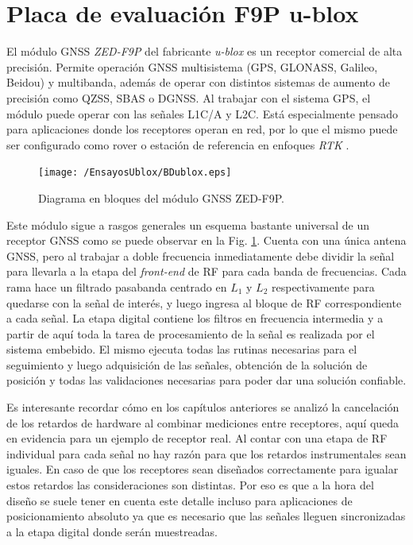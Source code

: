 \documentclass[a4paper,12pt,oneside,onecolumn,final,openright]{book}%
\begin{document}
\section{Placa de evaluación F9P u-blox}
	El módulo GNSS \textit{ZED-F9P} del fabricante \textit{u-blox} es un receptor comercial de alta precisión. Permite operación GNSS multisistema (GPS, GLONASS, Galileo, Beidou) y multibanda, además de operar con distintos sistemas de aumento de precisión como QZSS, SBAS o DGNSS. Al trabajar con el sistema GPS, el módulo puede operar con las señales L1C/A y L2C. Está especialmente pensado para aplicaciones donde los receptores operan en red, por lo que el mismo puede ser configurado como rover o estación de referencia en enfoques \textit{RTK} \cite{ZEDds}.

\begin{figure}
    \centering
    \texttt{[image: /EnsayosUblox/BDublox.eps]}
    \caption{Diagrama en bloques del módulo GNSS ZED-F9P.}
    \label{fig:BDublox}
\end{figure}
	Este módulo sigue a rasgos generales un esquema bastante universal de un receptor GNSS como se puede observar en la Fig. \ref{fig:BDublox}. Cuenta con una única antena GNSS, pero al trabajar a doble frecuencia inmediatamente debe dividir la señal para llevarla a la etapa del \textit{front-end} de RF para cada banda de frecuencias. Cada rama hace un filtrado pasabanda centrado en $L_1$ y $L_2$ respectivamente para quedarse con la señal de interés, y luego ingresa al bloque de RF correspondiente a cada señal. La etapa digital contiene los filtros en frecuencia intermedia y a partir de aquí toda la tarea de procesamiento de la señal es realizada por el sistema embebido. El mismo ejecuta todas las rutinas necesarias para el seguimiento y luego adquisición de las señales, obtención de la solución de posición y todas las validaciones necesarias para poder dar una solución confiable.
	
	Es interesante recordar cómo en los capítulos anteriores se analizó la cancelación de los retardos de hardware al combinar mediciones entre receptores, aquí queda en evidencia para un ejemplo de receptor real. Al contar con una etapa de RF individual para cada señal no hay razón para que los retardos instrumentales sean iguales. En caso de que los receptores sean diseñados correctamente para igualar estos retardos las consideraciones son distintas. Por eso es que a la hora del diseño se suele tener en cuenta este detalle incluso para aplicaciones de posicionamiento absoluto ya que es necesario que las señales lleguen sincronizadas a la etapa digital donde serán muestreadas. 
	
\end{document}
